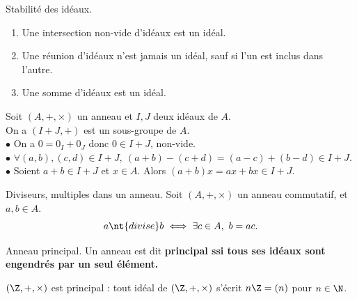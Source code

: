 \documentclass[11pt]{article}
\begin{document}
\vspace*{-0.7cm}

\begin{prop}{Stabilité des idéaux.}{}
    \begin{enumerate}
        \item Une intersection non-vide d'idéaux est un idéal.
        \item Une réunion d'idéaux n'est jamais un idéal, sauf si l'un est inclus dans l'autre.
        \item Une somme d'idéaux est un idéal.
    \end{enumerate}
    \tcblower
    Soit $(A,+,\times)$ un anneau et $I,J$ deux idéaux de $A$.\\
     On a $(I+J,+)$ est un sous-groupe de $A$.\\
    $\bullet$ On a $0=0_I+0_J$ donc $0\in I+J$, non-vide.\\
    $\bullet$ $\forall (a,b),(c,d)\in I + J, ~ (a+b)-(c+d)=(a-c)+(b-d)\in I + J$.\\
    $\bullet$ Soient $a+b\in I+J$ et $x\in A$. Alors $(a+b)x=ax+bx\in I + J$.
\end{prop}

\vspace*{-0.7cm}

\begin{defi}{Diviseurs, multiples dans un anneau.}{}
    Soit $(A,+,\times)$ un anneau commutatif, et $a,b\in A$.
    \begin{equation*}
        a \nt{ divise } b \iff \exists c \in A, ~ b = ac.
    \end{equation*}
\end{defi}

\vspace*{-0.7cm}

\begin{defi}{Anneau principal.}{}
    Un anneau est dit \bf{principal} ssi tous ses idéaux sont engendrés par un seul élément.
\end{defi}

\vspace*{-0.7cm}

\begin{ex}{}{}
    $(\Z,+,\times)$ est principal : tout idéal de $(\Z,+,\times)$ s'écrit $n\Z=(n)$ pour $n\in\N$.
\end{ex}
\end{document}
